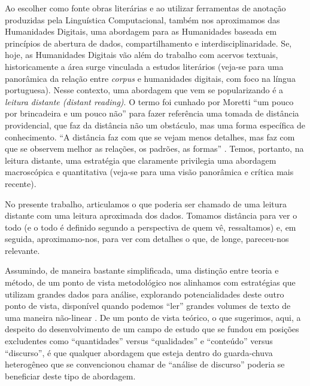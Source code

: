\documentclass[portuguese]{textolivre}
\begin{document}
Ao escolher como fonte obras literárias e ao utilizar ferramentas de anotação produzidas pela Linguística Computacional, também nos aproximamos das Humanidades Digitais, uma abordagem para as Humanidades baseada em princípios de abertura de dados, compartilhamento e interdisciplinaridade. Se, hoje, as Humanidades Digitais vão além do trabalho com acervos textuais, historicamente a área surge vinculada a estudos literários (veja-se \textcite{santos2019} para uma panorâmica da relação entre \textit{corpus} e humanidades digitais, com foco na língua portuguesa). Nesse contexto, uma abordagem que vem se popularizando é a \textit{leitura distante (distant reading)}. O termo foi cunhado por Moretti “um pouco por brincadeira e um pouco não” \cite[p. 8]{moretti2005} para fazer referência uma tomada de distância providencial, que faz da distância não um obstáculo, mas uma forma específica de conhecimento. “A distância faz com que se vejam menos detalhes, mas faz com que se observem melhor as relações, os padrões, as formas” \cite[p. 8]{moretti2005}. Temos, portanto, na leitura distante, uma estratégia que claramente privilegia uma abordagem macroscópica e quantitativa (veja-se \textcite{moretti2019} para uma visão panorâmica e crítica mais recente).

No presente trabalho, articulamos o que poderia ser chamado de uma leitura distante com uma leitura aproximada dos dados. Tomamos distância para ver o todo (e o todo é definido segundo a perspectiva de quem vê, ressaltamos) e, em seguida, aproximamo-nos, para ver com detalhes o que, de longe, pareceu-nos relevante.

Assumindo, de maneira bastante simplificada, uma distinção entre teoria e método, de um ponto de vista metodológico nos alinhamos com estratégias que utilizam grandes dados para análise, explorando potencialidades deste outro ponto de vista, disponível quando podemos “ler” grandes volumes de texto de uma maneira não-linear \cite{freitas2017, paixao2013}. De um ponto de vista teórico, o que sugerimos, aqui, a despeito do desenvolvimento de um campo de estudo que se fundou em posições excludentes como “quantidades” versus “qualidades” e “conteúdo” versus “discurso”, é que qualquer abordagem que esteja dentro do guarda-chuva heterogêneo que se convencionou chamar de “análise de discurso” poderia se beneficiar deste tipo de abordagem.
\end{document}
